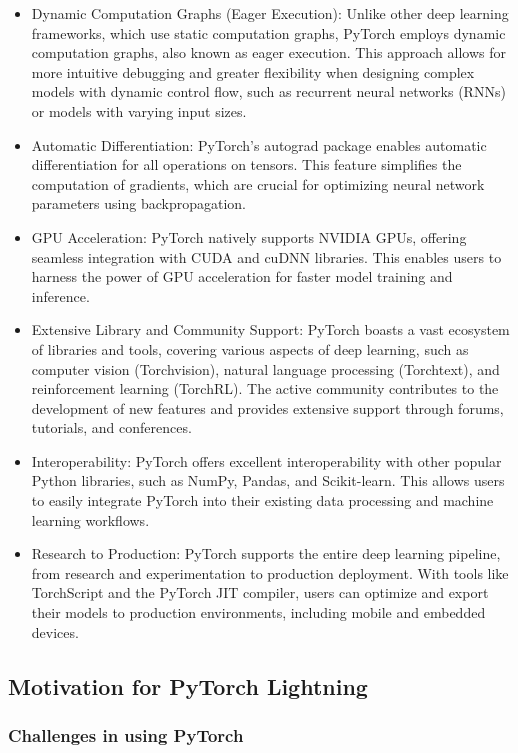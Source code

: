 \documentclass[12pt]{article}
\begin{document}
\begin{itemize}
    \item Dynamic Computation Graphs (Eager Execution): Unlike other deep learning frameworks, which use static computation graphs, PyTorch employs dynamic computation graphs, also known as eager execution. This approach allows for more intuitive debugging and greater flexibility when designing complex models with dynamic control flow, such as recurrent neural networks (RNNs) or models with varying input sizes.
    \item Automatic Differentiation: PyTorch's autograd package enables automatic differentiation for all operations on tensors. This feature simplifies the computation of gradients, which are crucial for optimizing neural network parameters using backpropagation.
    \item GPU Acceleration: PyTorch natively supports NVIDIA GPUs, offering seamless integration with CUDA and cuDNN libraries. This enables users to harness the power of GPU acceleration for faster model training and inference.
    \item Extensive Library and Community Support: PyTorch boasts a vast ecosystem of libraries and tools, covering various aspects of deep learning, such as computer vision (Torchvision), natural language processing (Torchtext), and reinforcement learning (TorchRL). The active community contributes to the development of new features and provides extensive support through forums, tutorials, and conferences.
    \item Interoperability: PyTorch offers excellent interoperability with other popular Python libraries, such as NumPy, Pandas, and Scikit-learn. This allows users to easily integrate PyTorch into their existing data processing and machine learning workflows.
    \item Research to Production: PyTorch supports the entire deep learning pipeline, from research and experimentation to production deployment. With tools like TorchScript and the PyTorch JIT compiler, users can optimize and export their models to production environments, including mobile and embedded devices.
\end{itemize}

\subsection{Motivation for PyTorch Lightning}

\subsubsection{Challenges in using PyTorch}
\end{document}
